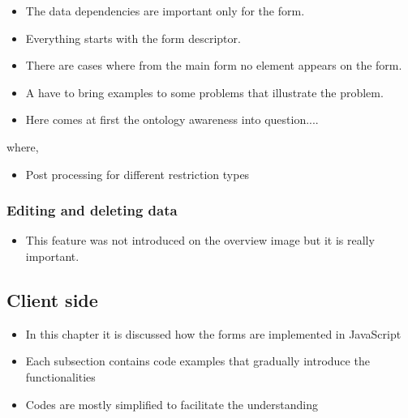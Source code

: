 \begin{itemize}
	\item The data dependencies are important only for the form. 
	\item Everything starts with the form descriptor.
	\item There are cases where from the main form no element appears on the form.
	\item A have to bring examples to some problems that illustrate the problem.
	\item Here comes at first the ontology awareness into question....
\end{itemize}



where,



\begin{itemize}
	\item Post processing for different restriction types
\end{itemize}



\subsubsection{Editing and deleting data}

\begin{itemize}
	\item This feature was not introduced on the overview image but it is really important.
\end{itemize}




\subsection{Client side}

\begin{itemize}
	\item In this chapter it is discussed how the forms are implemented in JavaScript
	\item Each subsection contains code examples that gradually introduce the functionalities
	\item Codes are mostly simplified to facilitate the understanding		
\end{itemize}


